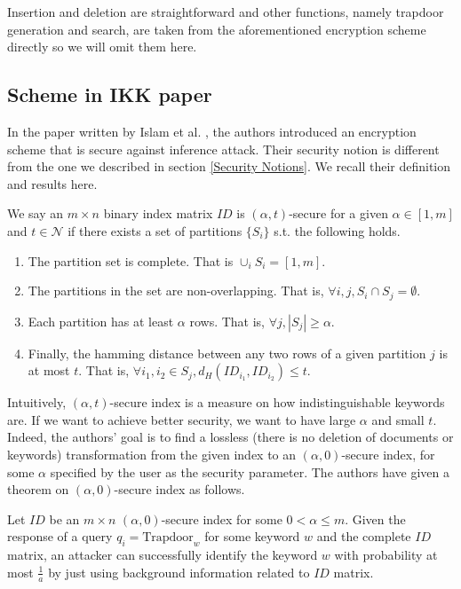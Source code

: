 Insertion and deletion are straightforward and other functions, namely trapdoor generation and search, are taken from the aforementioned encryption scheme directly so we will omit them here.



\subsection{Scheme in IKK paper}
In the paper written by Islam et al. \cite{NDSS:IslKuzKan12}, the authors introduced an encryption scheme that is secure against inference attack. Their security notion is different from the one we described in section \ref{Security Notions}. We recall their definition and results here.

\begin{definition} We say an $m \times n$ binary index matrix $ID$ is $(\alpha, t)$-secure for a given $\alpha \in [1,m]$ and $t \in \mathcal{N}$ if there exists a set of partitions $\{ S_i \}$ s.t. the following holds.
\begin{enumerate}
	\item The partition set is complete. That is $\cup_i S_i = [1,m]$.
	
	\item The partitions in the set are non-overlapping. That is, $\forall i,j, S_i \cap S_j = \emptyset$.
	
	\item Each partition has at least $\alpha$ rows. That is, $\forall j, |S_j| \geq \alpha$.
	
	\item Finally, the hamming distance between any two rows of a given partition $j$ is at most $t$. That is, $\forall i_1, i_2 \in S_j, d_H(ID_{i_1}, ID_{i_2}) \leq t$.
\end{enumerate}
\end{definition}

Intuitively, $(\alpha, t)$-secure index is a measure on how indistinguishable keywords are. If we want to achieve better security, we want to have large $\alpha$ and small $t$. Indeed, the authors' goal is to find a lossless (there is no deletion of documents or keywords) transformation from the given index to an $(\alpha, 0)$-secure index, for some $\alpha$ specified by the user as the security parameter. The authors have given a theorem on  $(\alpha, 0)$-secure index as follows.

\begin{theorem}
Let $ID$ be an $m \times n$ $(\alpha, 0)$-secure index for some $0 < \alpha \leq m$. Given the response of a query $q_i = \text{Trapdoor}_w$ for some keyword $w$ and the complete $ID$ matrix, an attacker can successfully identify the keyword $w$ with probability at most $\frac{1}{a}$ by just using background information related to $ID$ matrix.
\end{theorem}


